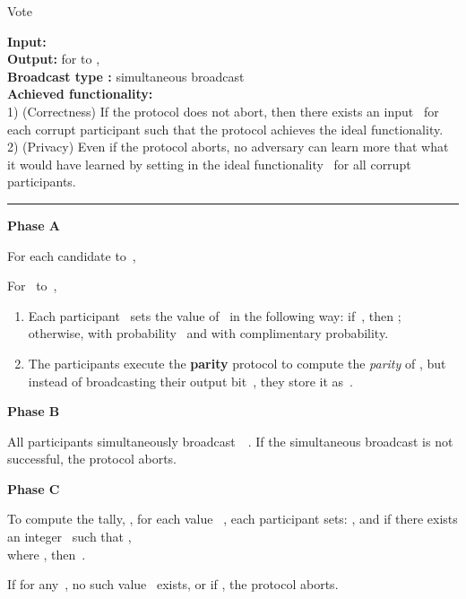 \documentclass[11pt]{article}
\begin{document}
\begin{protocol}
 \caption{Vote} \label{prot:vote}

{\bf Input:}  \\
{\bf Output:} for  to ,   \\
{\bf Broadcast type :} simultaneous broadcast\\
{\bf Achieved functionality:} \\
1) (Correctness) If the protocol does not abort, then there exists
an input~ for
each corrupt participant such that the protocol achieves the ideal functionality. \\
2) (Privacy) Even if the protocol aborts, no adversary can  learn
more that what it would have learned by setting in the ideal
functionality~ for all corrupt participants.

 \vspace{4pt} \hrule \vspace{4pt}

\textbf{Phase A}

For each candidate  to~,


\hspace{0.3cm} For ~to~,
\begin{enumerate}
\item \label{step:flip-1}Each participant~ sets the value of~ in the
following way: if~, then ; otherwise, 
with probability~ and  with complimentary
probability.
\item \label{step:parity} The participants execute the \textbf{parity} protocol to
compute the \emph{parity} of , but instead of
broadcasting their output bit~, they store it as~.
\end{enumerate}

\textbf{Phase B}

All participants simultaneously broadcast~~.
If the simultaneous broadcast is not successful, the protocol aborts. \\

\vspace{-.4cm}

\textbf{Phase C}

 To compute the tally, , for each value
~, each participant sets:
\mbox{}, \mbox{} and  if there exists an integer~ such
that , \\
where , then \,.

If for any~, no such value~ exists, or if , the protocol aborts.

\end{protocol}
\end{document}
